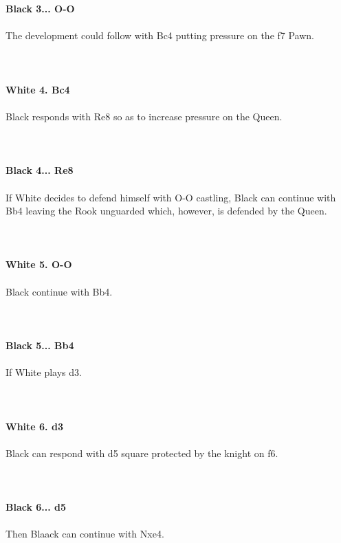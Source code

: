 \documentclass{article}
\begin{document}
\\
\\
\textbf{Black 3... O-O}\\
\\
The development could follow with Bc4 putting pressure on the f7 Pawn.\\
\\

\\
\\
\textbf{White 4. Bc4}\\
\\
Black responds with Re8 so as to increase pressure on the Queen.\\
\\

\\
\\
\textbf{Black 4... Re8}\\
\\
If White decides to defend himself with O-O castling, Black can continue with Bb4 leaving the Rook unguarded which, however, is defended by the Queen.\\
\\

\\
\\
\textbf{White 5. O-O}\\
\\
Black continue with Bb4.\\
\\

\\
\\
\textbf{Black 5... Bb4}\\
\\
If White plays d3.\\
\\

\\
\\
\textbf{White 6. d3}\\
\\
Black can respond with d5 square protected by the knight on f6.\\
\\

\\
\\
\textbf{Black 6... d5}\\
\\
Then Blaack can continue with Nxe4.\\
\end{document}
